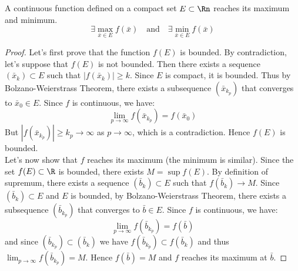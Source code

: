 \begin{theorem}
    A continuous function defined on a compact set $E \subset \Rn$ reaches its maximum and minimum.
    \[
        \exists \max_{\bar{x} \in E} f(\bar{x}) \quad \text{and} \quad \exists \min_{\bar{x} \in E} f(\bar{x})
    \]
\end{theorem}
\begin{proof}
    Let's first prove that the function $f(E)$ is bounded. By contradiction, let's suppose that $f(E)$ is not bounded. Then there exists a sequence $(\bar{x}_k) \subset E$ such that $|f(\bar{x}_k) | \geq k$. Since $E$ is compact, it is bounded. Thus by Bolzano-Weierstrass Theorem, there exists a subsequence $(\bar{x}_{k_p})$ that converges to $\bar{x}_0 \in E$. Since $f$ is continuous, we have:
    \[
        \lim_{p \to \infty} f(\bar{x}_{k_p}) = f(\bar{x}_0)
    \]
    But $|f(\bar{x}_{k_p})| \geq k_p \to \infty$ as $p \to \infty$, which is a contradiction. Hence $f(E)$ is bounded. \\
    Let's now show that $f$ reaches its maximum (the minimum is similar). Since the set $f(E) \subset \R$ is bounded, there exists $M = \sup f(E)$. By definition of supremum, there exists a sequence $(\bar{b}_k) \subset E$ such that $f(\bar{b}_k) \to M$. Since $(\bar{b}_k) \subset E$ and $E$ is bounded, by Bolzano-Weierstrass Theorem, there exists a subsequence $(\bar{b}_{k_p})$ that converges to $\bar{b} \in E$. Since $f$ is continuous, we have:
    \[
        \lim_{p \to \infty} f(\bar{b}_{k_p}) = f(\bar{b})
    \]
    and since $(\bar{b}_{k_p}) \subset (\bar{b}_k)$ we have $f(\bar{b}_{k_p}) \subset f(\bar{b}_k)$ and thus $\lim_{p \to \infty} f(\bar{b}_{k_p}) = M$. Hence $f(\bar{b}) = M$ and $f$ reaches its maximum at $\bar{b}$.
\end{proof}